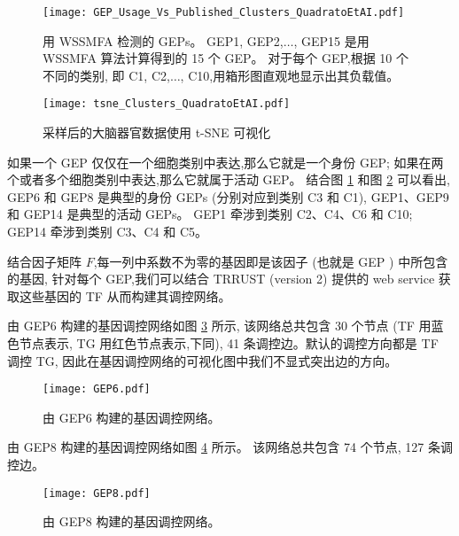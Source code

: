 \begin{figure}[!htbp]
    \centering
    \texttt{[image: GEP\_Usage\_Vs\_Published\_Clusters\_QuadratoEtAI.pdf]}
    \caption{
    用 WSSMFA 检测的 GEPs。
    GEP1, GEP2,$\ldots$, GEP15 是用 WSSMFA 算法计算得到的 15 个 GEP。
    对于每个 GEP,根据 10 个不同的类别,
    即 C1, C2,$\ldots$, C10,用箱形图直观地显示出其负载值。 
    }
    \label{fig:gep-gep}
\end{figure}

\begin{figure}[!htbp]
    \centering
    \texttt{[image: tsne\_Clusters\_QuadratoEtAI.pdf]}
    \caption{
    采样后的大脑器官数据使用 t-SNE 可视化
    }
    \label{fig:gep-tsne}
\end{figure}


如果一个 GEP 仅仅在一个细胞类别中表达,那么它就是一个身份 GEP;
如果在两个或者多个细胞类别中表达,那么它就属于活动 GEP。
结合图 \ref{fig:gep-gep} 和图 \ref{fig:gep-tsne} 可以看出, 
GEP6 和 GEP8 是典型的身份 GEPs (分别对应到类别 C3 和 C1), GEP1、GEP9 和 GEP14 是典型的活动 GEPs。
GEP1 牵涉到类别 C2、C4、C6 和 C10; GEP14 牵涉到类别 C3、C4 和 C5。


结合因子矩阵 $F$,每一列中系数不为零的基因即是该因子 (也就是 GEP ) 中所包含的基因,
针对每个 GEP,我们可以结合 TRRUST (version 2) 提供的 web service 获取这些基因的 TF 从而构建其调控网络。

由 GEP6 构建的基因调控网络如图 \ref{fig:gep-grn-gep6} 所示,
该网络总共包含 30 个节点 (TF 用蓝色节点表示, TG 用红色节点表示,下同), 41 条调控边。默认的调控方向都是 TF 调控 TG, 因此在基因调控网络的可视化图中我们不显式突出边的方向。
\begin{figure}[!htbp]
    \centering
    \texttt{[image: GEP6.pdf]}
    \caption{由 GEP6 构建的基因调控网络。}
    \label{fig:gep-grn-gep6}
\end{figure}

由 GEP8 构建的基因调控网络如图 \ref{fig:gep-grn-gep8} 所示。
该网络总共包含 74 个节点, 127 条调控边。
\begin{figure}[!htbp]
    \centering
    \texttt{[image: GEP8.pdf]}
    \caption{由 GEP8 构建的基因调控网络。}
    \label{fig:gep-grn-gep8}
\end{figure}

